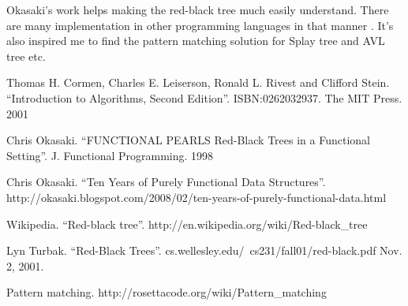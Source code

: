 \documentclass{article}
\begin{document}
Okasaki's work helps making the red-black tree much easily understand.
There are many implementation in other programming languages in that
manner \cite{rosetta}. It's also inspired me to find the pattern matching
solution for Splay tree and AVL tree etc.

\begin{thebibliography}{99}

Thomas H. Cormen, Charles E. Leiserson, Ronald L. Rivest and Clifford Stein.
``Introduction to Algorithms, Second Edition''. ISBN:0262032937. The MIT Press. 2001

Chris Okasaki. ``FUNCTIONAL PEARLS Red-Black Trees in a Functional Setting''. J. Functional Programming. 1998

Chris Okasaki. ``Ten Years of Purely Functional Data Structures''. http://okasaki.blogspot.com/2008/02/ten-years-of-purely-functional-data.html

Wikipedia. ``Red-black tree''. http://en.wikipedia.org/wiki/Red-black\_tree

Lyn Turbak. ``Red-Black Trees''. cs.wellesley.edu/~cs231/fall01/red-black.pdf Nov. 2, 2001.

Pattern matching. http://rosettacode.org/wiki/Pattern\_matching

\end{thebibliography}

\ifx\wholebook\relax\else
\end{document}
